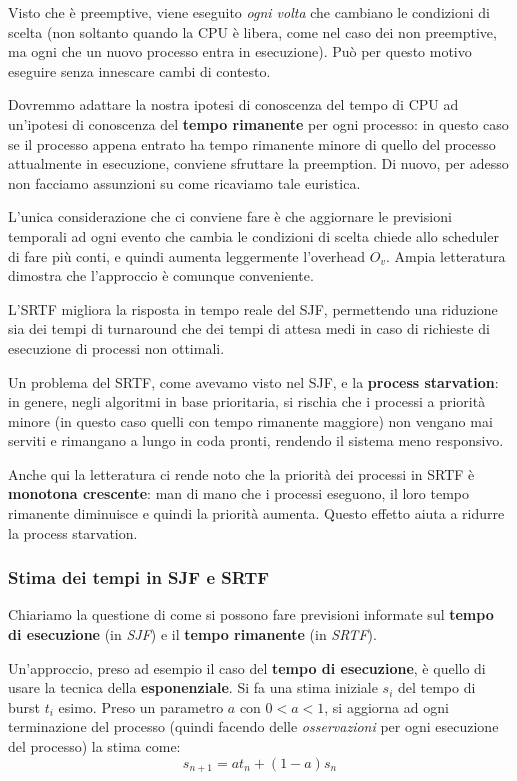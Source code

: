 \documentclass[a4paper,11pt]{article}
\begin{document}
Visto che è preemptive, viene eseguito \textit{ogni volta} che cambiano le condizioni di scelta (non soltanto quando la CPU è libera, come nel caso dei non preemptive, ma ogni che un nuovo processo entra in esecuzione).
Può per questo motivo eseguire senza innescare cambi di contesto.

Dovremmo adattare la nostra ipotesi di conoscenza del tempo di CPU ad un'ipotesi di conoscenza del \textbf{tempo rimanente} per ogni processo: in questo caso se il processo appena entrato ha tempo rimanente minore di quello del processo attualmente in esecuzione, conviene sfruttare la preemption.
Di nuovo, per adesso non facciamo assunzioni su come ricaviamo tale euristica.

L'unica considerazione che ci conviene fare è che aggiornare le previsioni temporali ad ogni evento che cambia le condizioni di scelta chiede allo scheduler di fare più conti, e quindi aumenta leggermente l'overhead $O_v$.
Ampia letteratura dimostra che l'approccio è comunque conveniente. 

L'SRTF migliora la risposta in tempo reale del SJF, permettendo una riduzione sia dei tempi di turnaround che dei tempi di attesa medi in caso di richieste di esecuzione di processi non ottimali. 

Un problema del SRTF, come avevamo visto nel SJF, e la \textbf{process starvation}: in genere, negli algoritmi in base prioritaria, si rischia che i processi a priorità minore (in questo caso quelli con tempo rimanente maggiore) non vengano mai serviti e rimangano a lungo in coda pronti, rendendo il sistema meno responsivo.

Anche qui la letteratura ci rende noto che la priorità dei processi in SRTF è \textbf{monotona crescente}: man di mano che i processi eseguono, il loro tempo rimanente diminuisce e quindi la priorità aumenta. Questo effetto aiuta a ridurre la process starvation.

\subsubsection{Stima dei tempi in SJF e SRTF}
Chiariamo la questione di come si possono fare previsioni informate sul \textbf{tempo di esecuzione} (in \textit{SJF}) e il \textbf{tempo rimanente} (in \textit{SRTF}).

Un'approccio, preso ad esempio il caso del \textbf{tempo di esecuzione}, è quello di usare la tecnica della \textbf{esponenziale}.
Si fa una stima iniziale $s_i$ del tempo di burst $t_i$ esimo.
Preso un parametro $a$ con $0 < a < 1$, si aggiorna ad ogni terminazione del processo (quindi facendo delle \textit{osservazioni} per ogni esecuzione del processo) la stima come:
$$
s_{n + 1} = a t_n + (1 - a) s_n
$$
\end{document}
